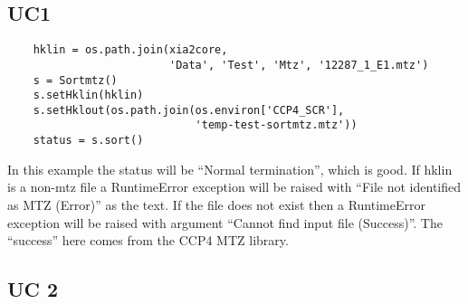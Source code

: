 \documentclass[a4paper, 11pt]{article}
\begin{document}
\subsection{UC1}

{
\tiny
\begin{verbatim}
    hklin = os.path.join(xia2core,
                         'Data', 'Test', 'Mtz', '12287_1_E1.mtz')
    s = Sortmtz()
    s.setHklin(hklin)
    s.setHklout(os.path.join(os.environ['CCP4_SCR'],
                             'temp-test-sortmtz.mtz'))
    status = s.sort()
\end{verbatim}
}

In this example the status will be ``Normal termination'', which is good.
If hklin is a non-mtz file a RuntimeError exception will be raised with
``File not identified as MTZ (Error)'' as the text. If the file does 
not exist then a RuntimeError exception will be raised with argument
``Cannot find input file (Success)''. The ``success'' here comes from the 
CCP4 MTZ library.

\subsection{UC 2}
\end{document}
